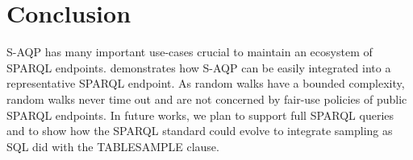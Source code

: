 
\section{Conclusion}

S-AQP has many important use-cases crucial to maintain an ecosystem of SPARQL endpoints. \NAME demonstrates how S-AQP can be
easily integrated into a representative SPARQL endpoint. As random
walks have a bounded complexity, random walks never time out and are not concerned by fair-use policies of public SPARQL endpoints.  In
future works, we plan to support full SPARQL queries and to show
how the SPARQL standard could evolve to integrate sampling as SQL
did with the TABLESAMPLE clause.
